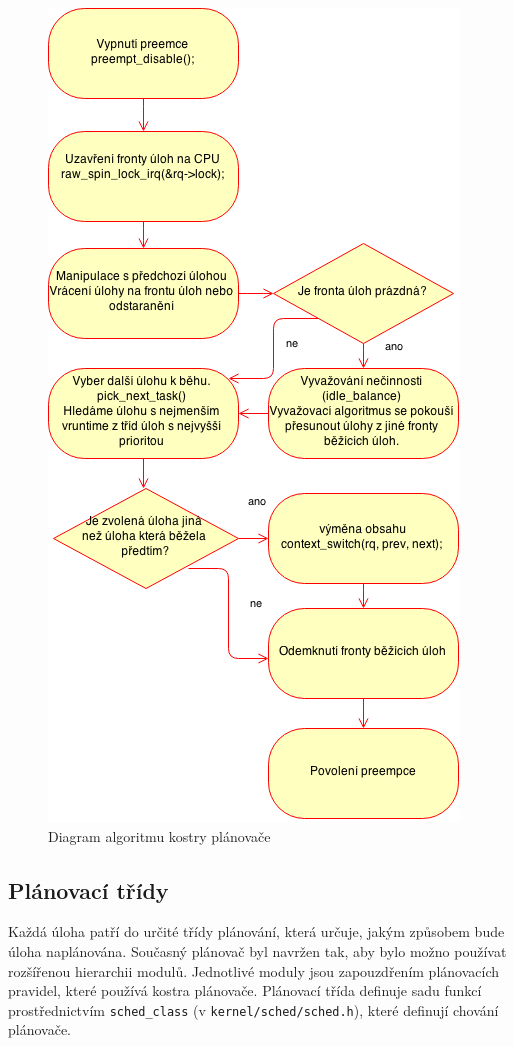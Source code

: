 \documentclass[
  master=true,
  font=sans,
  printversion=false,
  joinlists=true,
  figures=true,
  tables=true,
  sourcecodes=false,
  theorems=false,
  bibencoding=utf8,
  language=czech,
  encoding=utf8,
  field=ainfk,
  biblatex,
  glossaries,
  index
]{kidiplom}
\begin{document}
\begin{figure}[p]
\center
\includegraphics[scale=0.7]{obrazky/kostraPlanovace.png}
\caption{Diagram algoritmu kostry plánovače}
\label{kostra planovace}
\end{figure}

\newpage
\subsection{Plánovací třídy}
Každá úloha patří do určité třídy plánování, která určuje, jakým způsobem bude úloha naplánována. 
Současný plánovač byl navržen tak, aby bylo možno používat rozšířenou hierarchii modulů. Jednotlivé moduly jsou zapouzdřením plánovacích pravidel, které používá kostra plánovače. 
Plánovací třída definuje sadu funkcí prostřednictvím \verb#sched_class# (v \verb#kernel/sched/sched.h#), které definují chování plánovače.\newline 
\end{document}
